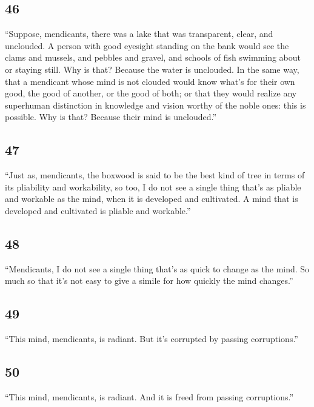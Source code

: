 \documentclass[12pt,openany]{book}%
\let\oldcontentsline\contentsline
\newcommand{\nopagecontentsline}[3]{\oldcontentsline{#1}{#2}{}}
\begin{document}
\subsection*{46 }

“Suppose, mendicants, there was a lake that was transparent, clear, and unclouded. A person with good eyesight standing on the bank would see the clams and mussels, and pebbles and gravel, and schools of fish swimming about or staying still. Why is that? Because the water is unclouded. In the same way, that a mendicant whose mind is not clouded would know what’s for their own good, the good of another, or the good of both; or that they would realize any superhuman distinction in knowledge and vision worthy of the noble ones: this is possible. Why is that? Because their mind is unclouded.” 

\subsection*{47 }

“Just as, mendicants, the boxwood is said to be the best kind of tree in terms of its pliability and workability, so too, I do not see a single thing that’s as pliable and workable as the mind, when it is developed and cultivated. A mind that is developed and cultivated is pliable and workable.” 

\subsection*{48 }

“Mendicants, I do not see a single thing that’s as quick to change as the mind. So much so that it’s not easy to give a simile for how quickly the mind changes.” 

\subsection*{49 }

“This mind, mendicants, is radiant. But it’s corrupted by passing corruptions.” 

\subsection*{50 }

“This mind, mendicants, is radiant. And it is freed from passing corruptions.” 

%
\end{document}
